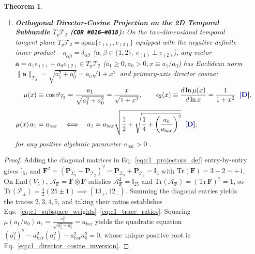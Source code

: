 \documentclass[11pt,a4paper]{article}
\newcommand{\catD}{\text{\textbf{\textcolor{blue!75!black}{[D]}}}}
\newcommand{\catH}{\text{\textbf{\textcolor{orange!80!black}{[H]}}}}
\theoremstyle{definition}
\theoremstyle{plain}
\newtheorem{theorem}[axiom]{Theorem}
\theoremstyle{remark}
\begin{document}
\begin{theorem}
\begin{enumerate}[label=(\roman*)]
\begin{align}
  \gamma_{\mathrm{slice/base}} &\equiv \frac{\mathrm{Tr}(\mathbf{P}_{\Sigma_3})}{\mathrm{Tr}(\mathbf{P}_{\mathcal{T}_2})} = \frac{d_s}{d_t} = \frac{3}{2} \;\;\catD, \nonumber \\[4pt]
  \psi_{\max} &\equiv \frac{\mathrm{Tr}(\mathbf{P}_{\mathcal{T}_2})}{\dim\mathrm{End}(T_p\mathcal{M}_{3,2})} = \frac{d_t}{D^2} = \frac{2}{25} \;\;\catH, &
  A_{\mathrm{crit}} &\equiv \frac{1}{\dim\mathrm{End}(T_p\mathcal{T}_2)} = \frac{1}{d_t^2} = \frac{1}{4} \;\;\catH. \label{eq:c1_trace_ratios}
  \end{align}
  \item \textbf{Orthogonal Director-Cosine Projection on the 2D Temporal Subbundle $T_p\mathcal{T}_2$ (\texttt{COR~\#016--\#018}):}
  On the two-dimensional temporal tangent plane $T_p\mathcal{T}_2 = \mathrm{span}\{e_{(1)}, e_{(2)}\}$ equipped with the negative-definite inner product $-\eta_{\alpha\beta} = \delta_{\alpha\beta}$ ($\alpha,\beta \in \{1,2\}$, $e_{(1)} \perp e_{(2)}$), any vector $\mathbf{a} = a_1 e_{(1)} + a_0 e_{(2)} \in T_p\mathcal{T}_2$ ($a_1 \ge 0, a_0 > 0, x \equiv a_1/a_0$) has Euclidean norm $\|\mathbf{a}\|_{\mathcal{T}_2} = \sqrt{a_1^2 + a_0^2} = a_0\sqrt{1 + x^2}$ and primary-axis director cosine:
  \begin{align}
  \mu(x) &\equiv \cos\vartheta_{\mathcal{T}_2} = \frac{a_1}{\sqrt{a_1^2 + a_0^2}} = \frac{x}{\sqrt{1 + x^2}}, \qquad
  \epsilon_2(x) \equiv \frac{d\ln\mu(x)}{d\ln x} = \frac{1}{1 + x^2} \;\;\catD, \nonumber \\[4pt]
  \mu(x)\,a_1 &= a_{\mathrm{bar}} \quad \Longleftrightarrow \quad
  a_1 = a_{\mathrm{bar}}\sqrt{\frac{1}{2} + \sqrt{\frac{1}{4} + \left(\frac{a_0}{a_{\mathrm{bar}}}\right)^2}} \;\;\catD, \label{eq:c1_director_cosine_inversion}
  \end{align}
  for any positive algebraic parameter $a_{\mathrm{bar}} > 0$ \catD.
\end{enumerate}
\end{theorem}

\begin{proof}
Adding the diagonal matrices in Eq.~\eqref{eq:c1_projectors_def} entry-by-entry gives $\mathbb{I}_5$, and $\mathbf{F}^2 = (\mathbf{P}_{\Sigma_3} - \mathbf{P}_{\mathcal{T}_2})^2 = \mathbf{P}_{\Sigma_3} + \mathbf{P}_{\mathcal{T}_2} = \mathbb{I}_5$ with $\mathrm{Tr}(\mathbf{F}) = 3 - 2 = +1$. On $\mathrm{End}(V_5)$, $\mathcal{A}_{\mathbf{F}} = \mathbf{F}\otimes\mathbf{F}$ satisfies $\mathcal{A}_{\mathbf{F}}^2 = \mathbb{I}_{25}$ and $\mathrm{Tr}(\mathcal{A}_{\mathbf{F}}) = (\mathrm{Tr}\,\mathbf{F})^2 = 1$, so $\mathrm{Tr}(\mathcal{P}_\pm) = \frac{1}{2}(25 \pm 1) \implies (13_+, 12_-)$. Summing the diagonal entries yields the traces $2, 3, 4, 5$, and taking their ratios establishes Eqs.~\eqref{eq:c1_subspace_weights}--\eqref{eq:c1_trace_ratios}. Squaring $\mu(a_1/a_0)\,a_1 = \frac{a_1^2}{\sqrt{a_1^2 + a_0^2}} = a_{\mathrm{bar}}$ yields the quadratic equation $(a_1^2)^2 - a_{\mathrm{bar}}^2(a_1^2) - a_{\mathrm{bar}}^2 a_0^2 = 0$, whose unique positive root is Eq.~\eqref{eq:c1_director_cosine_inversion}.
\end{proof}
\end{document}

